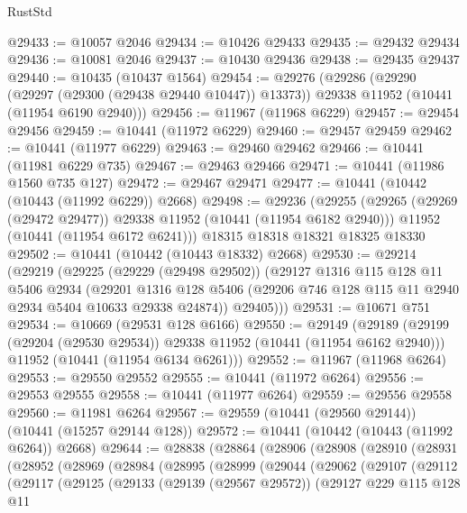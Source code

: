 \begin{lexlean}{RustStd}
\begin{coremodule}
@29433 := @10057 @2046
@29434 := @10426 @29433
@29435 := @29432 @29434
@29436 := @10081 @2046
@29437 := @10430 @29436
@29438 := @29435 @29437
@29440 := @10435 (@10437 @1564)
@29454 := @29276
    (@29286
      (@29290 (@29297 (@29300 (@29438 @29440 @10447)) @13373))
      @29338
      @11952
      (@10441 (@11954 @6190 @2940)))
@29456 := @11967 (@11968 @6229)
@29457 := @29454 @29456
@29459 := @10441 (@11972 @6229)
@29460 := @29457 @29459
@29462 := @10441 (@11977 @6229)
@29463 := @29460 @29462
@29466 := @10441 (@11981 @6229 @735)
@29467 := @29463 @29466
@29471 := @10441 (@11986 @1560 @735 @127)
@29472 := @29467 @29471
@29477 := @10441 (@10442 (@10443 (@11992 @6229)) @2668)
@29498 := @29236
    (@29255
      (@29265 (@29269 (@29472 @29477)) @29338 @11952 (@10441 (@11954 @6182 @2940)))
      @11952
      (@10441 (@11954 @6172 @6241)))
    @18315
    @18318
    @18321
    @18325
    @18330
@29502 := @10441 (@10442 (@10443 @18332) @2668)
@29530 := @29214
    (@29219
      (@29225
        (@29229 (@29498 @29502))
        (@29127
          @1316
          @115
          @128
          @11
          @5406
          @2934
          (@29201
            @1316
            @128
            @5406
            (@29206 @746 @128 @115 @11 @2940 @2934 @5404 @10633 @29338 @24874))
          @29405)))
@29531 := @10671 @751
@29534 := @10669 (@29531 @128 @6166)
@29550 := @29149
    (@29189
      (@29199 (@29204 (@29530 @29534)) @29338 @11952 (@10441 (@11954 @6162 @2940)))
      @11952
      (@10441 (@11954 @6134 @6261)))
@29552 := @11967 (@11968 @6264)
@29553 := @29550 @29552
@29555 := @10441 (@11972 @6264)
@29556 := @29553 @29555
@29558 := @10441 (@11977 @6264)
@29559 := @29556 @29558
@29560 := @11981 @6264
@29567 := @29559 (@10441 (@29560 @29144)) (@10441 (@15257 @29144 @128))
@29572 := @10441 (@10442 (@10443 (@11992 @6264)) @2668)
@29644 := @28838
    (@28864
      (@28906
        (@28908
          (@28910
            (@28931
              (@28952
                (@28969
                  (@28984
                    (@28995
                      (@28999
                        (@29044
                          (@29062
                            (@29107
                              (@29112
                                (@29117
                                  (@29125
                                    (@29133
                                      (@29139 (@29567 @29572))
                                      (@29127
                                        @229
                                        @115
                                        @128
                                        @11

\end{coremodule}
\end{lexlean}
